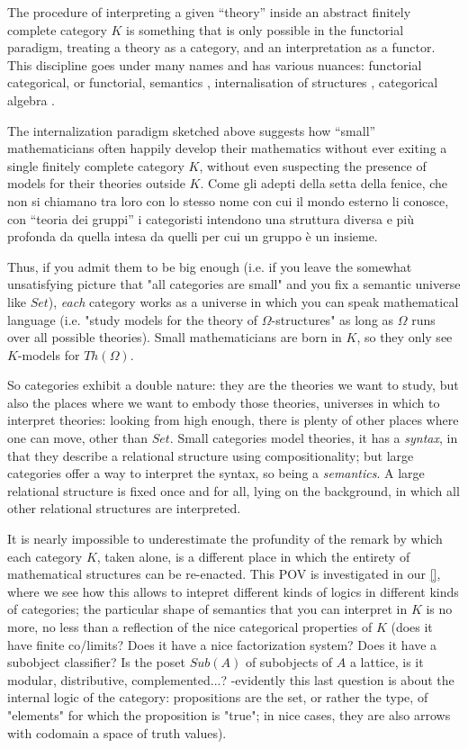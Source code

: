 \documentclass{amsart}
\begin{document}
The procedure of interpreting a given ``theory'' inside an abstract finitely complete category $K$ is something that is only possible in the functorial paradigm, treating a theory as a category, and an interpretation as a functor. This discipline goes under many names and has various nuances: functorial categorical, or functorial, semantics \cite{}, internalisation of structures \cite{}, categorical algebra \cite{}.

The internalization paradigm sketched above suggests how ``small'' mathematicians often happily develop their mathematics without ever exiting a single finitely complete category $K$, without even suspecting the presence of models for their theories outside $K$. Come gli adepti della setta della fenice, che non si chiamano tra loro con lo stesso nome con cui il mondo esterno li conosce, con ``teoria dei gruppi'' i categoristi intendono una struttura diversa e più profonda da quella intesa da quelli per cui un gruppo è un insieme.

Thus, if you admit them to be big enough (i.e. if you leave the somewhat unsatisfying picture that "all categories are small" and you fix a semantic universe like $Set$), \emph{each} category works as a universe in which you can speak mathematical language (i.e. "study models for the theory of $\Omega$-structures" as long as $\Omega$ runs over all possible theories). Small mathematicians are born in $K$, so they only see $K$-models for $Th(\Omega)$.

So categories exhibit a double nature: they are the theories we want to study, but also the places where we want to embody those theories, universes in which to interpret theories: looking from high enough, there is plenty of other places where one can move, other than $Set$. Small categories model theories, it has a \emph{syntax}, in that they describe a relational structure using compositionality; but large categories offer a way to interpret the syntax, so being a \emph{semantics}. A large relational structure is fixed once and for all, lying on the background, in which all other relational structures are interpreted.

It is nearly impossible to underestimate the profundity of the remark by which each category $K$, taken alone, is a different place in which the entirety of mathematical structures can be re-enacted. This POV is investigated in our \ref{}, where we see how this allows to intepret different kinds of logics in different kinds of categories; the particular shape of semantics that you can interpret in $K$ is no more, no less than a reflection of the nice categorical properties of $K$ (does it have finite co/limits? Does it have a nice factorization system? Does it have a subobject classifier? Is the poset $Sub(A)$ of subobjects of $A$ a lattice, is it modular, distributive, complemented...? -evidently this last question is about the internal logic of the category: propositions are the set, or rather the type, of "elements" for which the proposition is "true"; in nice cases, they are also arrows with codomain a space of truth values).
\end{document}
